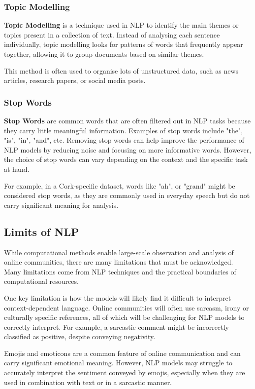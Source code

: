 \documentclass[12pt, a4paper]{article}
\begin{document}
\subsubsection{Topic Modelling}
\textbf{Topic Modelling} is a technique used in NLP to identify the main themes or topics present in a collection of text. Instead of analysing each sentence individually, topic modelling looks for patterns of words that frequently appear together, allowing it to group documents based on similar themes.

This method is often used to organise lots of unstructured data, such as news articles, research papers, or social media posts.

\subsubsection{Stop Words}
\textbf{Stop Words} are common words that are often filtered out in NLP tasks because they carry little meaningful information. Examples of stop words include "the", "is", "in", "and", etc. Removing stop words can help improve the performance of NLP models by reducing noise and focusing on more informative words. However, the choice of stop words can vary depending on the context and the specific task at hand.

For example, in a Cork-specific dataset, words like "ah", or "grand" might be considered stop words, as they are commonly used in everyday speech but do not carry significant meaning for analysis. \cite{mungalpara2022stemming}

\subsection{Limits of NLP}
\label{sec:nlp_limitations}
While computational methods enable large-scale observation and analysis of online communities, there are many limitations that must be acknowledged. Many limitations come from NLP techniques and the practical boundaries of computational resources.

One key limitation is how the models will likely find it difficult to interpret context-dependent language. Online communities will often use sarcasm, irony or culturally specific references, all of which will be challenging for NLP models to correctly interpret. For example, a sarcastic comment might be incorrectly classified as positive, despite conveying negativity.

Emojis and emoticons are a common feature of online communication and can carry significant emotional meaning. However, NLP models may struggle to accurately interpret the sentiment conveyed by emojis, especially when they are used in combination with text or in a sarcastic manner. \cite{ahmad2024sentiment}
\end{document}
